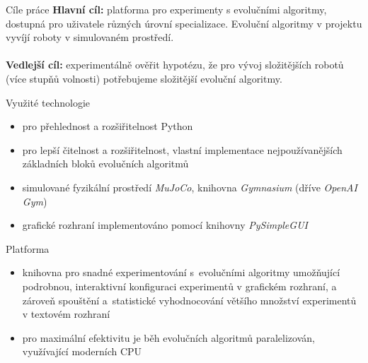 \documentclass[portrait,a0paper,fontscale=0.25]{baposter}
\begin{document}
\begin{poster}
\begin{posterbox}[column=0, name=goals, below=uvod, headerColorOne=cyan!60, boxColorOne=cyan!20]{Cíle práce}
\textbf{Hlavní cíl:} platforma pro experimenty s evolučními algoritmy, dostupná
pro uživatele různých úrovní specializace. Evoluční algoritmy v projektu
vyvíjí roboty v simulovaném prostředí.
\\\\
\textbf{Vedlejší cíl:} experimentálně ověřit hypotézu, že pro
vývoj složitějších robotů (více stupňů volnosti) potřebujeme složitější
evoluční algoritmy.
\end{posterbox}

\begin{posterbox}[column=0, name=something1, below=goals]{Využité technologie}
\begin{itemize}[leftmargin=*]
    \item pro přehlednost a rozšiřitelnost Python
    \item pro lepší čitelnost a rozšiřitelnost, vlastní implementace
        nejpoužívanějších základních bloků evolučních algoritmů
    \item simulované fyzikální prostředí \emph{MuJoCo}, knihovna
        \emph{Gymnasium} (dříve \emph{OpenAI Gym})
    \item grafické rozhraní implementováno pomocí knihovny \linebreak \emph{PySimpleGUI}
\end{itemize}

\end{posterbox}

\begin{posterbox}[column=0, name=newsomething2, below=something1]{Platforma}
\begin{itemize}[leftmargin=*]
    \item knihovna pro snadné experimentování s~evolučními algoritmy umožňující
        podrobnou, interaktivní konfiguraci \linebreak experimentů v grafickém rozhraní, a
        zároveň spouštění a~statistické vyhodnocování většího množství
        experimentů v textovém rozhraní
    \item pro maximální efektivitu je běh evolučních algoritmů \linebreak paralelizován,
        využívající moderních CPU


\end{itemize}
\end{posterbox}
\end{poster}
\end{document}
